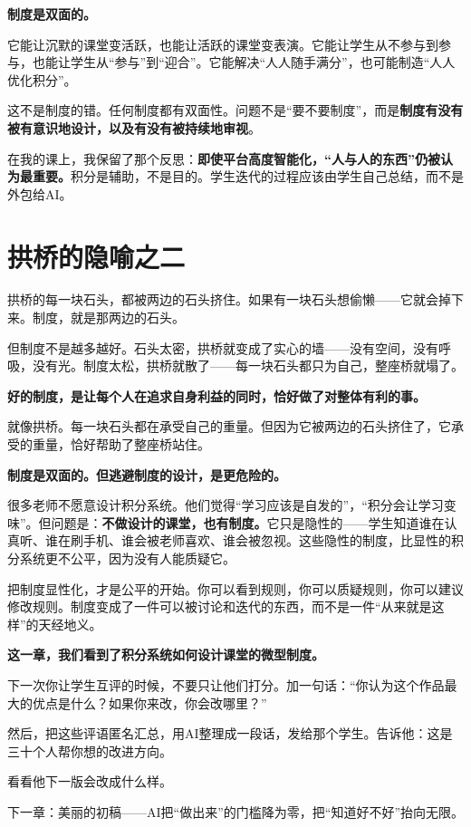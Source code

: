 \textbf{制度是双面的。}

它能让沉默的课堂变活跃，也能让活跃的课堂变表演。它能让学生从不参与到参与，也能让学生从``参与''到``迎合''。它能解决``人人随手满分''，也可能制造``人人优化积分''。

这不是制度的错。任何制度都有双面性。问题不是``要不要制度''，而是\textbf{制度有没有被有意识地设计，以及有没有被持续地审视}。

在我的课上，我保留了那个反思：\textbf{即使平台高度智能化，``人与人的东西''仍被认为最重要。}积分是辅助，不是目的。学生迭代的过程应该由学生自己总结，而不是外包给AI。

\section{拱桥的隐喻之二}

拱桥的每一块石头，都被两边的石头挤住。如果有一块石头想偷懒——它就会掉下来。制度，就是那两边的石头。

但制度不是越多越好。石头太密，拱桥就变成了实心的墙——没有空间，没有呼吸，没有光。制度太松，拱桥就散了——每一块石头都只为自己，整座桥就塌了。

\textbf{好的制度，是让每个人在追求自身利益的同时，恰好做了对整体有利的事。}

就像拱桥。每一块石头都在承受自己的重量。但因为它被两边的石头挤住了，它承受的重量，恰好帮助了整座桥站住。

\begin{shiyu-note}
\label{note:chap5}

\textbf{制度是双面的。但逃避制度的设计，是更危险的。}

很多老师不愿意设计积分系统。他们觉得``学习应该是自发的''，``积分会让学习变味''。但问题是：\textbf{不做设计的课堂，也有制度。}它只是隐性的——学生知道谁在认真听、谁在刷手机、谁会被老师喜欢、谁会被忽视。这些隐性的制度，比显性的积分系统更不公平，因为没有人能质疑它。

把制度显性化，才是公平的开始。你可以看到规则，你可以质疑规则，你可以建议修改规则。制度变成了一件可以被讨论和迭代的东西，而不是一件``从来就是这样''的天经地义。
\end{shiyu-note}

\vspace{1cm}

\begin{decision-point}
\label{decision:chap5}

\noindent\textbf{这一章，我们看到了积分系统如何设计课堂的微型制度。}

\vspace{0.3cm}

\noindent 下一次你让学生互评的时候，不要只让他们打分。加一句话：``你认为这个作品最大的优点是什么？如果你来改，你会改哪里？''

\noindent 然后，把这些评语匿名汇总，用AI整理成一段话，发给那个学生。告诉他：这是三十个人帮你想的改进方向。

\noindent 看看他下一版会改成什么样。
\end{decision-point}

\vspace{0.5cm}

\begin{flushright}
{\small\color{muted} 下一章：美丽的初稿——AI把``做出来''的门槛降为零，把``知道好不好''抬向无限。}
\end{flushright}